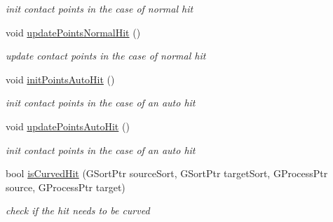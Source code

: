 \begin{DoxyCompactItemize}
\begin{DoxyCompactList}\small\item\em init contact points in the case of normal hit \end{DoxyCompactList}\item 
\hypertarget{classGAction_a0df07896e15cc7d479d158a28c350713}{void \hyperlink{classGAction_a0df07896e15cc7d479d158a28c350713}{update\+Points\+Normal\+Hit} ()}\label{classGAction_a0df07896e15cc7d479d158a28c350713}

\begin{DoxyCompactList}\small\item\em update contact points in the case of normal hit \end{DoxyCompactList}\item 
\hypertarget{classGAction_a31e9d06194e01e691e1ca8e1a64ad73f}{void \hyperlink{classGAction_a31e9d06194e01e691e1ca8e1a64ad73f}{init\+Points\+Auto\+Hit} ()}\label{classGAction_a31e9d06194e01e691e1ca8e1a64ad73f}

\begin{DoxyCompactList}\small\item\em init contact points in the case of an auto hit \end{DoxyCompactList}\item 
\hypertarget{classGAction_a63727f6b50a489bc6d820055bd040adb}{void \hyperlink{classGAction_a63727f6b50a489bc6d820055bd040adb}{update\+Points\+Auto\+Hit} ()}\label{classGAction_a63727f6b50a489bc6d820055bd040adb}

\begin{DoxyCompactList}\small\item\em init contact points in the case of an auto hit \end{DoxyCompactList}\item 
\hypertarget{classGAction_a92cac7175b3969a54197d401c13f5273}{bool \hyperlink{classGAction_a92cac7175b3969a54197d401c13f5273}{is\+Curved\+Hit} (G\+Sort\+Ptr source\+Sort, G\+Sort\+Ptr target\+Sort, G\+Process\+Ptr source, G\+Process\+Ptr target)}\label{classGAction_a92cac7175b3969a54197d401c13f5273}

\begin{DoxyCompactList}\small\item\em check if the hit needs to be curved \end{DoxyCompactList}\end{DoxyCompactItemize}
